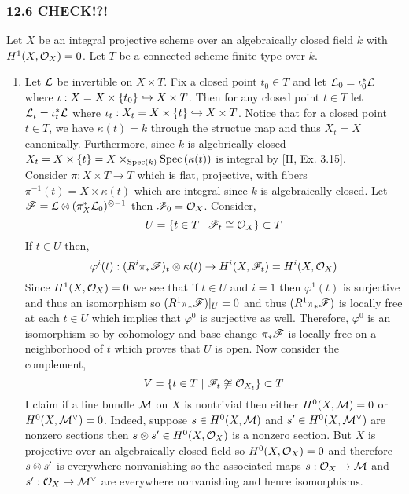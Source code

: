 \documentclass[12pt]{article}
\begin{document}
\subsubsection{12.6 CHECK!?!}

Let $X$ be an integral projective scheme over an algebraically closed field $k$ with $H^1(X, \mathcal{O}_{X}) = 0$. Let $T$ be a connected scheme finite type over $k$.

\begin{enumerate}
\item Let $\mathcal{L}$ be invertible on $X \times T$. Fix a closed point $t_0 \in T$ and let $\mathcal{L}_0 = \iota_0^* \mathcal{L}$ where $\iota : X = X \times \{t_0\} \hookrightarrow X \times T$. Then for any closed point $t \in T$ let $\mathcal{L}_t = \iota^*_t \mathcal{L}$ where $\iota_t : X_t = X \times \{ t \} \hookrightarrow X \times T$. Notice that for a closed point $t \in T$, we have $\kappa(t) = k$ through the structue map and thus $X_t = X$ canonically. Furthermore, since $k$ is algebrically closed $X_t = X \times \{ t \} = X \times_{\mathrm{Spec}\left( k \right)} \mathrm{Spec}\left( \kappa(t) \right)$ is integral by [II, Ex. 3.15].
\bigskip\\
Consider $\pi : X \times T \to T$ which is flat, projective, with fibers $\pi^{-1}(t) = X \times \kappa(t)$ which are integral since $k$ is algebraically closed. Let $\mathscr{F} = \mathcal{L} \otimes (\pi_X^* \mathcal{L}_0)^{\otimes -1}$ then $\mathscr{F}_0 = \mathcal{O}_{X}$. Consider,
\[ U = \{ t \in T \mid \mathscr{F}_t \cong \mathcal{O}_{X} \} \subset T \]
If $t \in U$ then,
\[ \varphi^i(t) : (R^i \pi_* \mathscr{F})_t \otimes \kappa(t) \to H^i(X, \mathscr{F}_t) = H^i(X, \mathcal{O}_{X})  \]
Since $H^1(X, \mathcal{O}_{X}) = 0$ we see that if $t \in U$ and $i = 1$ then $\varphi^1(t)$ is surjective and thus an isomorphism so $(R^1 \pi_* \mathscr{F})|_U = 0$ and thus $(R^1 \pi_* \mathscr{F})$ is locally free at each $t \in U$ which implies that $\varphi^0$ is surjective as well. Therefore, $\varphi^0$ is an isomorphism so by cohomology and base change $\pi_* \mathscr{F}$ is locally free on a neighborhood of $t$ which proves that $U$ is open. Now consider the complement,
\[ V = \{ t \in T \mid \mathscr{F}_t \not\cong \mathcal{O}_{X_t} \} \subset T \]
I claim if a line bundle $\mathcal{M}$ on $X$ is nontrivial then either $H^0(X, \mathcal{M}) = 0$ or $H^0(X, \mathcal{M}^\vee) = 0$. Indeed, suppose $s \in H^0(X, \mathcal{M})$ and $s' \in H^0(X, \mathcal{M}^\vee)$ are nonzero sections then $s \otimes s' \in H^0(X, \mathcal{O}_{X})$ is a nonzero section. But $X$ is projective over an algebraically closed field so $H^0(X, \mathcal{O}_{X}) = 0$ and therefore $s \otimes s'$ is everywhere nonvanishing so the associated maps $s : \mathcal{O}_{X} \to \mathcal{M}$ and $s' : \mathcal{O}_{X} \to \mathcal{M}^\vee$ are everywhere nonvanishing and hence isomorphisms.
\bigskip\\

\end{enumerate}
\end{document}
